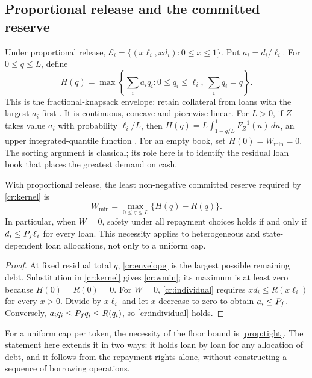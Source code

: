 \subsection{Proportional release and the committed reserve}\label{cr:proportional}\label{sec:credit-buffer}

Under proportional release, $\mathcal E_i=\{(x\ell_i,xd_i):0\le x\le1\}$. Put $a_i=d_i/\ell_i$. For $0\le q\le L$, define
\begin{equation}\label{cr:envelope}
H(q)=\max\left\{\sum_i a_iq_i:
0\le q_i\le\ell_i,\ \sum_iq_i=q\right\}.
\end{equation}
This is the fractional-knapsack envelope: retain collateral from loans with the largest $a_i$ first \citep{kellerer2004}. It is continuous, concave and piecewise linear. For $L>0$, if $Z$ takes value $a_i$ with probability $\ell_i/L$, then $H(q)=L\int_{1-q/L}^{1}F_Z^{-1}(u)\,du$, an upper integrated-quantile function \citep{gushchin2017}. For an empty book, set $H(0)=W_{\min}=0$. The sorting argument is classical; its role here is to identify the residual loan book that places the greatest demand on cash.

\begin{theorem}\label{cr:buffer}
With proportional release, the least non-negative committed reserve required by \cref{cr:kernel} is
\begin{equation}\label{cr:wmin}
W_{\min}=\max_{0\le q\le L}\{H(q)-R(q)\}.
\end{equation}
In particular, when $W=0$, safety under all repayment choices holds if and only if $d_i\le P_f\ell_i$ for every loan. This necessity applies to heterogeneous and state-dependent loan allocations, not only to a uniform cap.
\end{theorem}
\begin{proof}
At fixed residual total $q$, \eqref{cr:envelope} is the largest possible remaining debt. Substitution in \cref{cr:kernel} gives \eqref{cr:wmin}; its maximum is at least zero because $H(0)=R(0)=0$. For $W=0$, \eqref{cr:individual} requires $xd_i\le R(x\ell_i)$ for every $x>0$. Divide by $x\ell_i$ and let $x$ decrease to zero to obtain $a_i\le P_f$. Conversely, $a_iq_i\le P_f q_i\le R(q_i)$, so \eqref{cr:individual} holds.
\end{proof}

For a uniform cap per token, the necessity of the floor bound is \cref{prop:tight}. The statement here extends it in two ways: it holds loan by loan for any allocation of debt, and it follows from the repayment rights alone, without constructing a sequence of borrowing operations.

